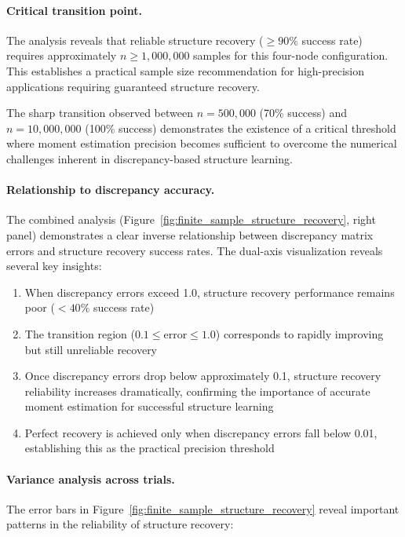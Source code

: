 \documentclass[11pt,a4paper]{article}
\numberwithin{equation}{section}
\begin{document}
\paragraph{Critical transition point.} The analysis reveals that reliable structure recovery ($\geq 90\%$ success rate) requires approximately $n \geq 1{,}000{,}000$ samples for this four-node configuration. This establishes a practical sample size recommendation for high-precision applications requiring guaranteed structure recovery.

The sharp transition observed between $n = 500{,}000$ (70\% success) and $n = 10{,}000{,}000$ (100\% success) demonstrates the existence of a critical threshold where moment estimation precision becomes sufficient to overcome the numerical challenges inherent in discrepancy-based structure learning.

\paragraph{Relationship to discrepancy accuracy.} The combined analysis (Figure~\ref{fig:finite_sample_structure_recovery}, right panel) demonstrates a clear inverse relationship between discrepancy matrix errors and structure recovery success rates. The dual-axis visualization reveals several key insights:

\begin{enumerate}[label=(\arabic*)]
\item When discrepancy errors exceed 1.0, structure recovery performance remains poor ($<40\%$ success rate)
\item The transition region ($0.1 \leq \text{error} \leq 1.0$) corresponds to rapidly improving but still unreliable recovery
\item Once discrepancy errors drop below approximately 0.1, structure recovery reliability increases dramatically, confirming the importance of accurate moment estimation for successful structure learning
\item Perfect recovery is achieved only when discrepancy errors fall below 0.01, establishing this as the practical precision threshold
\end{enumerate}

\paragraph{Variance analysis across trials.} The error bars in Figure~\ref{fig:finite_sample_structure_recovery} reveal important patterns in the reliability of structure recovery:
\end{document}
